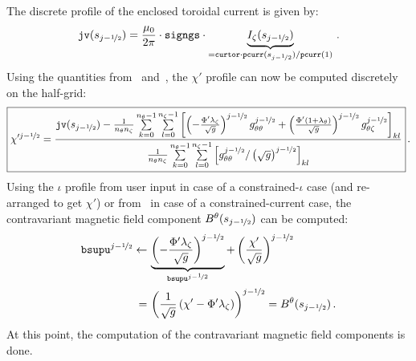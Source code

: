 The discrete profile of the enclosed toroidal current is given by:
\begin{equation}
  \texttt{jv}(s_{j-\nicefrac{1}{2}}) = \frac{\mu_0}{2 \pi} \cdot \texttt{signgs} \cdot \underbrace{I_\zeta(s_{j-\nicefrac{1}{2}})}_{= \texttt{curtor} \cdot \texttt{pcurr}(s_{j-\nicefrac{1}{2}}) / \texttt{pcurr}(1) } \, .
\end{equation}
Using the quantities from~ and~,
the $\chi'$ profile can now be computed discretely on the half-grid:
\begin{equation}
  \boxed{
  \chi'^{j-\nicefrac{1}{2}} = \frac{ \texttt{jv}(s_{j-\nicefrac{1}{2}})
                          - \frac{1}{n_\theta n_\zeta} \sum\limits_{k=0}^{n_\theta - 1} \sum\limits_{l=0}^{n_\zeta - 1}
                            \left[   \left( - \frac{\Phi'           \lambda_\zeta        }{\sqrt{g}} \right)^{j-\nicefrac{1}{2}} g_{\theta \theta}^{j-\nicefrac{1}{2}}
                                   + \left(   \frac{\Phi' \left(1 + \lambda_\theta\right)}{\sqrt{g}} \right)^{j-\nicefrac{1}{2}} g_{\theta \zeta }^{j-\nicefrac{1}{2}} \right]_{kl}}
                         {  \frac{1}{n_\theta n_\zeta} \sum\limits_{k=0}^{n_\theta - 1} \sum\limits_{l=0}^{n_\zeta - 1}
                            \left[ g_{\theta \theta}^{j-\nicefrac{1}{2}} / \left( \sqrt{g} \right)^{j-\nicefrac{1}{2}} \right]_{kl}} } \, . \label{eqn:chip_half}
\end{equation}
Using the $\iota$ profile from user input in case of a constrained-$\iota$ case
(and  re-arranged to get $\chi'$)
or from~ in case of a constrained-current case,
the contravariant magnetic field component $B^\theta(s_{j-\nicefrac{1}{2}})$ can be computed:
\begin{align}
  \texttt{bsupu}^{j-\nicefrac{1}{2}} \leftarrow&\, \underbrace{\left( - \frac{\Phi' \lambda_\zeta}{\sqrt{g}} \right)^{j-\nicefrac{1}{2}}}_{\texttt{bsupu}^{j-\nicefrac{1}{2}}} + \left( \frac{\chi'}{\sqrt{g}} \right)^{j-\nicefrac{1}{2}} \nonumber \\
                               =&\, \left( \frac{1}{\sqrt{g}} \left( \chi' - \Phi' \lambda_\zeta \right) \right)^{j-\nicefrac{1}{2}} = B^\theta(s_{j-\nicefrac{1}{2}}) \, .
\end{align}
At this point, the computation of the contravariant magnetic field components is done.

\FloatBarrier
